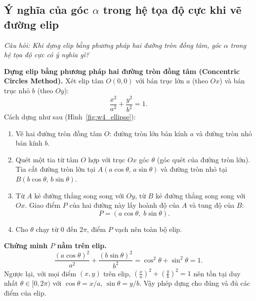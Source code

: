 \subsection{Ý nghĩa của góc $\alpha$ trong hệ tọa độ cực khi vẽ đường elip}
\label{subsec:w4_ellipse_alpha}

\textit{Câu hỏi: Khi dựng elip bằng phương pháp hai đường tròn đồng tâm, góc $\alpha$ trong hệ tọa độ cực có ý nghĩa gì?}

\textbf{Dựng elip bằng phương pháp hai đường tròn đồng tâm (Concentric Circles Method).} Xét elip tâm $O(0, 0)$ với bán trục lớn $a$ (theo $Ox$) và bán trục nhỏ $b$ (theo $Oy$):
\begin{equation}
\frac{x^2}{a^2} + \frac{y^2}{b^2} = 1.
\end{equation}
Cách dựng như sau (Hình~\ref{fig:w4_ellipse}):
\begin{enumerate}
    \item Vẽ hai đường tròn đồng tâm $O$: đường tròn lớn bán kính $a$ và đường tròn nhỏ bán kính $b$.
    \item Quét một tia từ tâm $O$ hợp với trục $Ox$ góc $\theta$ (góc quét của đường tròn lớn). Tia cắt đường tròn lớn tại $A(a\cos\theta,\, a\sin\theta)$ và đường tròn nhỏ tại $B(b\cos\theta,\, b\sin\theta)$.
    \item Từ $A$ kẻ đường thẳng song song với $Oy$, từ $B$ kẻ đường thẳng song song với $Ox$. Giao điểm $P$ của hai đường này lấy hoành độ của $A$ và tung độ của $B$:
    \begin{equation}
    P = (a\cos\theta,\; b\sin\theta).
    \end{equation}
    \item Cho $\theta$ chạy từ $0$ đến $2\pi$, điểm $P$ vạch nên toàn bộ elip.
\end{enumerate}

\textbf{Chứng minh $P$ nằm trên elip.}
\begin{equation}
\frac{(a\cos\theta)^2}{a^2} + \frac{(b\sin\theta)^2}{b^2} = \cos^2\theta + \sin^2\theta = 1.
\end{equation}
Ngược lại, với mọi điểm $(x, y)$ trên elip, $\left(\frac{x}{a}\right)^2 + \left(\frac{y}{b}\right)^2 = 1$ nên tồn tại duy nhất $\theta \in [0, 2\pi)$ với $\cos\theta = x/a$, $\sin\theta = y/b$. Vậy phép dựng cho đúng và đủ các điểm của elip.

